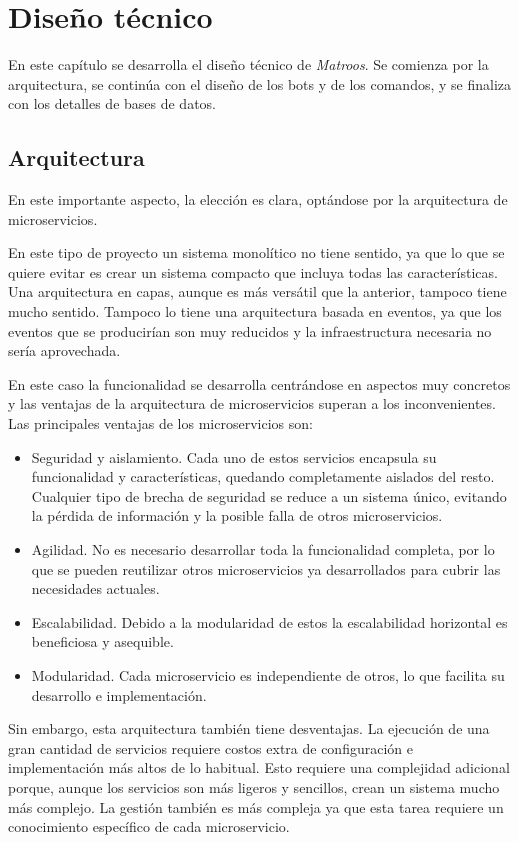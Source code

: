 \chapter{Diseño técnico}
 
En este capítulo se desarrolla el diseño técnico de \textit{Matroos}. Se comienza por la arquitectura, se continúa con el diseño de los bots y de los comandos, y se finaliza con los detalles de bases de datos.

\section{Arquitectura}

En este importante aspecto, la elección es clara, optándose por la arquitectura de microservicios.

En este tipo de proyecto un sistema monolítico no tiene sentido, ya que lo que se quiere evitar es crear un sistema compacto que incluya todas las características. Una arquitectura en capas, aunque es más versátil que la anterior, tampoco tiene mucho sentido. Tampoco lo tiene una arquitectura basada en eventos, ya que los eventos que se producirían son muy reducidos y la infraestructura necesaria no sería aprovechada.

En este caso la funcionalidad se desarrolla centrándose en aspectos muy concretos y las ventajas de la arquitectura de microservicios superan a los inconvenientes. Las principales ventajas de los microservicios son:

\begin{itemize}
	\item Seguridad y aislamiento. Cada uno de estos servicios encapsula su funcionalidad y características, quedando completamente aislados del resto. Cualquier tipo de brecha de seguridad se reduce a un sistema único, evitando la pérdida de información y la posible falla de otros microservicios.
	\item Agilidad. No es necesario desarrollar toda la funcionalidad completa, por lo que se pueden reutilizar otros microservicios ya desarrollados para cubrir las necesidades actuales.
	\item Escalabilidad. Debido a la modularidad de estos la escalabilidad horizontal es beneficiosa y asequible.
	\item Modularidad. Cada microservicio es independiente de otros, lo que facilita su desarrollo e implementación.
\end{itemize}

Sin embargo, esta arquitectura también tiene desventajas. La ejecución de una gran cantidad de servicios requiere costos extra de configuración e implementación más altos de lo habitual. Esto requiere una complejidad adicional porque, aunque los servicios son más ligeros y sencillos, crean un sistema mucho más complejo. La gestión también es más compleja ya que esta tarea requiere un conocimiento específico de cada microservicio.

